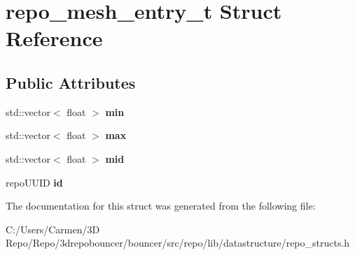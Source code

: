 \hypertarget{structrepo__mesh__entry__t}{}\section{repo\+\_\+mesh\+\_\+entry\+\_\+t Struct Reference}
\label{structrepo__mesh__entry__t}
\subsection*{Public Attributes}
\begin{DoxyCompactItemize}
\item 
\hypertarget{structrepo__mesh__entry__t_ad457b26fd9e1063c67256dd4850a1e0a}{}std\+::vector$<$ float $>$ {\bfseries min}\label{structrepo__mesh__entry__t_ad457b26fd9e1063c67256dd4850a1e0a}

\item 
\hypertarget{structrepo__mesh__entry__t_ab955d0154a8f9b54f83482abbf27b8aa}{}std\+::vector$<$ float $>$ {\bfseries max}\label{structrepo__mesh__entry__t_ab955d0154a8f9b54f83482abbf27b8aa}

\item 
\hypertarget{structrepo__mesh__entry__t_ae3f1b9322d26f8a6a3a9923b9946da2b}{}std\+::vector$<$ float $>$ {\bfseries mid}\label{structrepo__mesh__entry__t_ae3f1b9322d26f8a6a3a9923b9946da2b}

\item 
\hypertarget{structrepo__mesh__entry__t_a506ae567e99926f08b8df79f37f5e8d0}{}repo\+U\+U\+I\+D {\bfseries id}\label{structrepo__mesh__entry__t_a506ae567e99926f08b8df79f37f5e8d0}

\end{DoxyCompactItemize}


The documentation for this struct was generated from the following file\+:\begin{DoxyCompactItemize}
\item 
C\+:/\+Users/\+Carmen/3\+D Repo/\+Repo/3drepobouncer/bouncer/src/repo/lib/datastructure/repo\+\_\+structs.\+h\end{DoxyCompactItemize}
